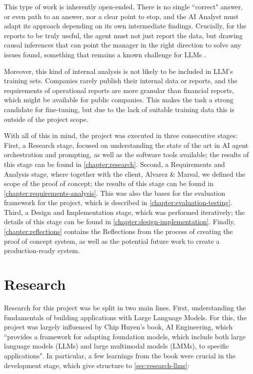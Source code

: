 \documentclass[a4paper]{report}
\begin{document}
This type of work is inherently open-ended. There is no single ``correct" answer, or even path to an answer, nor a clear point to stop, and the AI Analyst must adapt its approach depending on its own intermediate findings. Crucially, for the reports to be truly useful, the agent must not just report the data, but drawing causal inferences that can point the manager in the right direction to solve any issues found, something that remains a known challenge for LLMs \cite{llmcausalreasoning2024}.

Moreover, this kind of internal analysis is not likely to be included in LLM's training sets. Companies rarely publish their internal data or reports, and the requirements of operational reports are more granular than financial reports, which might be available for public companies. This makes the task a strong candidate for fine-tuning, but due to the lack of suitable training data this is outside of the project scope.

With all of this in mind, the project was executed in three consecutive stages: First, a Research stage, focused on understanding the state of the art in AI agent orchestration and prompting, as well as the software tools available; the results of this stage can be found in \autoref{chapter:research}. Second, a Requirements and Analysis stage, where together with the client, Alvarez \& Marsal, we defined the scope of the proof of concept; the results of this stage can be found in \autoref{chapter:requirements-analysis}. This was also the bases for the evaluation framework for the project, which is described in \autoref{chapter:evaluation-testing}. Third, a Design and Implementation stage, which was performed iteratively; the details of this stage can be found in \autoref{chapter:design-implementation}. Finally, \autoref{chapter:reflections} contains the Reflections from the process of creating the proof of concept system, as well as the potential future work to create a production-ready system.

\chapter{Research}
\label{chapter:research}

Research for this project was be split in two main lines. First, understanding the fundamentals of building applications with Large Language Models. For this, the project was largely influenced by Chip Huyen's book, AI Engineering, which ``provides a framework for adapting foundation models, which include both large language models (LLMs) and large multimodal models (LMMs), to specific applications"\cite{aiebook2025}. In particular, a few learnings from the book were crucial in the development stage, which give structure to \autoref{sec:research-llms}:
\end{document}
